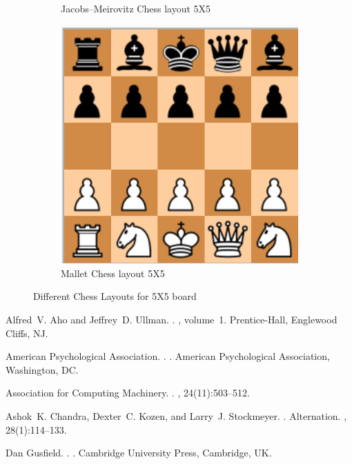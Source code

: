 \documentclass[11pt]{article}
\begin{document}
\begin{figure}[h!]
\begin{subfigure}[b]{0.7\linewidth}
    \caption{Jacobs–Meirovitz Chess layout 5X5}
  \end{subfigure}
  \begin{subfigure}[b]{0.7\linewidth}
    \includegraphics[width=\linewidth]{wallet.png}
    \caption{Mallet Chess layout 5X5}
  \end{subfigure}
  \caption{Different Chess Layouts for 5X5 board}  
  \label{fig:coffee}
\end{figure}

\begin{thebibliography}{}

Alfred~V. Aho and Jeffrey~D. Ullman.
.
, volume~1.
\newblock Prentice-{Hall}, Englewood Cliffs, NJ.

{American Psychological Association}.
.
.
\newblock American Psychological Association, Washington, DC.

{Association for Computing Machinery}.
.
, 24(11):503--512.

Ashok~K. Chandra, Dexter~C. Kozen, and Larry~J. Stockmeyer.
.
\newblock Alternation.
,
  28(1):114--133.

Dan Gusfield.
.
.
\newblock Cambridge University Press, Cambridge, UK.

\end{thebibliography}
\end{document}
